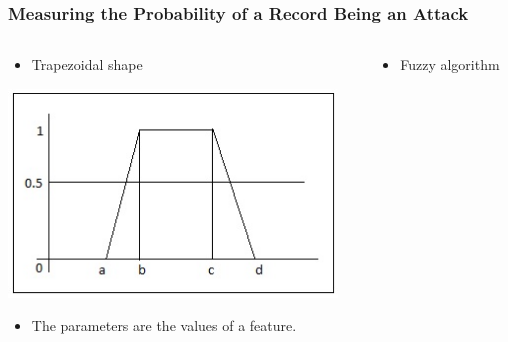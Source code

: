 \documentclass{beamer}
\begin{document}
\begin{frame}
  \frametitle{Measuring the Probability of a Record Being an Attack}

  \begin{columns}
  \begin{column}{0.4\textwidth}
  \begin{itemize}
  	\item Trapezoidal shape
  \end{itemize}
  
  \includegraphics[width=0.95\textwidth]{../trapFigure.jpg}
  
  \begin{itemize}
	\item The parameters are the values of a feature.
  \end{itemize}  
  
  \end{column}


  \begin{column}{0.6\textwidth}
  \begin{itemize}
  	\item Fuzzy algorithm
  \end{itemize}
  
\begin{algorithmic}
\ELSE {}
\ENDIF
\end{algorithmic}

  \end{column}
  \end{columns}
\end{frame}
\end{document}
